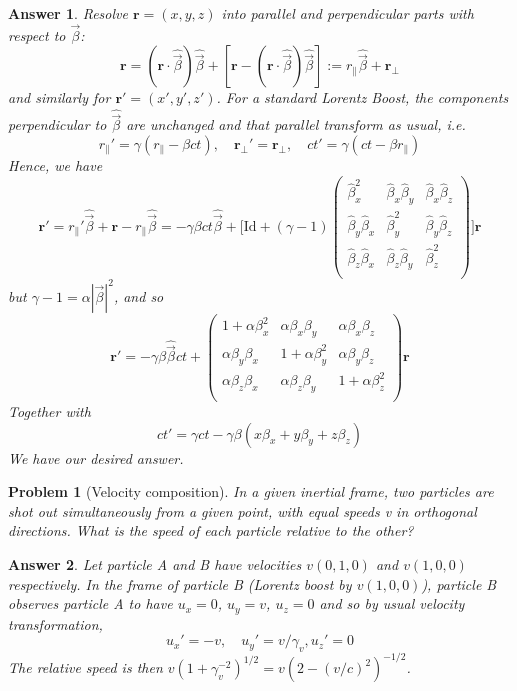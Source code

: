 \documentclass[a4paper]{article}
\newtheorem{ans}{Answer}[subsection]
\theoremstyle{new}
\newtheorem{qns}{Problem}[section]
\begin{document}
\begin{ans}
Resolve $\mathbf{r}=(x,y,z)$ into parallel and perpendicular parts with respect to $\vec{\beta}$:
$$\mathbf{r}=(\mathbf{r}\cdot\hat{\vec{\beta}})\hat{\vec{\beta}}+[\mathbf{r}-(\mathbf{r}\cdot\hat{\vec{\beta}})\hat{\vec{\beta}}]:=r_\parallel\hat{\vec{\beta}}+\mathbf{r_{\perp}}$$
and similarly for $\mathbf{r'}=(x',y',z')$. For a standard Lorentz Boost, the components perpendicular to $\hat{\vec{\beta}}$ are unchanged and that parallel transform as usual, i.e.
$$r_\parallel'=\gamma(r_\parallel-\beta ct),\quad\mathbf{r_\perp'}=\mathbf{r_{\perp}},\quad ct'=\gamma(ct-\beta r_\parallel)$$
Hence, we have
$$\mathbf{r'}=r_\parallel'\hat{\vec{\beta}}+\mathbf{r}-r_\parallel\hat{\vec{\beta}}=-\gamma\beta ct\hat{\vec{\beta}}+\bigg[\text{Id}+(\gamma-1)
\begin{pmatrix}\hat{\beta}_x^2&\hat{\beta}_x\hat{\beta}_y&\hat{\beta}_x\hat{\beta}_z\\
\hat{\beta}_y\hat{\beta}_x&\hat{\beta}_y^2&\hat{\beta}_y\hat{\beta}_z\\
\hat{\beta}_z\hat{\beta}_x&\hat{\beta}_z\hat{\beta}_y&\hat{\beta}_z^2\\\end{pmatrix}\bigg]\mathbf{r}$$
but $\gamma-1=\alpha|\vec{\beta}|^2$, and so
$$\mathbf{r'}=-\gamma\beta \hat{\vec{\beta}}ct+\begin{pmatrix}1+\alpha\beta_x^2&\alpha\beta_x\beta_y&\alpha\beta_x\beta_z\\\alpha\beta_y\beta_x&1+\alpha\beta_y^2&\alpha\beta_y\beta_z\\\alpha\beta_z\beta_x&\alpha\beta_z\beta_y&1+\alpha\beta_z^2\\\end{pmatrix}\mathbf{r}$$
Together with
$$ct'=\gamma ct-\gamma\beta(x\beta_x+y\beta_y+z\beta_z)$$
We have our desired answer.
\end{ans}
\begin{qns}[Velocity composition]
In a given inertial frame, two particles are shot out simultaneously from a given
point, with equal speeds v in orthogonal directions. What is the speed of each particle
relative to the other?
\end{qns}
\begin{ans}
Let particle A and B have velocities $v(0,1,0)$ and $v(1,0,0)$ respectively. In the frame of particle B (Lorentz boost by $v(1,0,0)$), particle B observes particle A to have $u_x=0$, $u_y=v$, $u_z=0$ and so by usual velocity transformation,
$$u_x'=-v,\quad u_y'=v/\gamma_v,u_z'=0$$
The relative speed is then $v(1+\gamma_v^{-2})^{1/2}=v(2-(v/c)^2)^{-1/2}$.
\end{ans}
\end{document}
